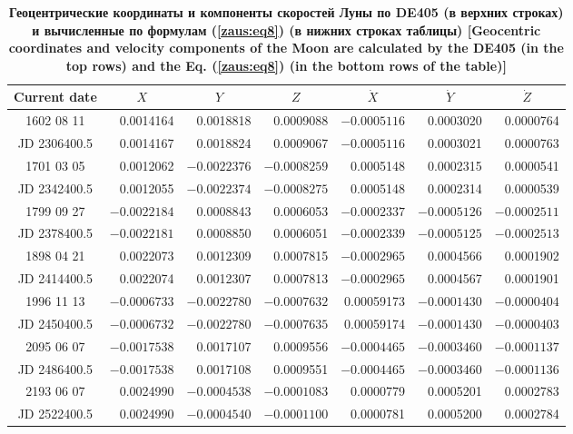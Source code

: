\begin{table}
\center \small
\begin{minipage}[t]{160mm}
\centering
\caption{\bf Геоцентрические координаты и компоненты скоростей Луны по DE405 (в верхних строках) и вычисленные по формулам  (\ref{zaus:eq8}) (в нижних строках таблицы) [Geocentric coordinates and velocity components of the Moon are calculated by the  DE405 (in the top rows) and the Eq. (\ref{zaus:eq8}) (in the bottom rows of the table)]
\vspace{-3mm}}
\begin{tabular}{|c|r|r|r|r|r|r|}
\hline
\footnotesize
\rule{0mm}{12pt}%
Current date & \multicolumn{1}{c|}{\footnotesize $X$}&	\multicolumn{1}{c|}{\footnotesize $Y$}&	\multicolumn{1}{c|}{\footnotesize $Z$}&	\multicolumn{1}{c|}{\footnotesize $\dot{X}$}&	\multicolumn{1}{c|}{\footnotesize $\dot{Y}$}&	\multicolumn{1}{c|}{\footnotesize$\dot{Z}$}\\ \hline
\rule{0mm}{14pt}%
1602 08 11&	0.0014164&	0.0018818&	0.0009088&	$-0.0005116$&	0.0003020&	  0.0000764\\
JD 2306400.5&	0.0014167&	0.0018824&	0.0009067&	$-0.0005116$&	0.0003021&	  0.0000763\\ \hline
1701 03 05&	0.0012062&	$-0.0022376$&	$-0.0008259$&	0.0005148&	0.0002315&	 0.0000541\\
JD 2342400.5&	0.0012055&	$-0.0022374$&	$-0.0008275$&	0.0005148&	0.0002314&	 0.0000539\\ \hline
1799 09 27&	$-0.0022184$&	0.0008843&	0.0006053&	$-0.0002337$ &	$-0.0005126$ &	 $-0.0002511$\\
JD 2378400.5&	$-0.0022181$ &	0.0008850&	0.0006051&	$-0.0002339$ &	$-0.0005125$&	 $-0.0002513$\\ \hline
1898 04 21&	0.0022073&	0.0012309&	0.0007815&	$-0.0002965$&	0.0004566&	 0.0001902\\
JD 2414400.5&	0.0022074&	0.0012307&	0.0007813&	$-0.0002965$&	0.0004567&	 0.0001901\\ \hline
1996 11 13&	$-0.0006733$&	$-0.0022780$&	$-0.0007632$&	0.00059173&	$-0.0001430$&	  $-0.0000404$\\
JD 2450400.5&	$-0.0006732$&	$-0.0022780$&	$-0.0007635$&	0.00059174&	$-0.0001430$&	  $-0.0000403$\\ \hline
2095 06 07&	$-0.0017538$&	0.0017107&	0.0009556&	 $-0.0004465$&	$-0.0003460$&	 $-0.0001137$\\
JD 2486400.5&	$-0.0017538$&	0.0017108&	0.0009551&	 $-0.0004465$&	$-0.0003460$&	 $-0.0001136$\\ \hline
2193 06 07&	0.0024990&	$-0.0004538$&	$-0.0001083$&	0.0000779&	0.0005201&	 0.0002783\\
JD 2522400.5&	0.0024990&	$-0.0004540$&	$-0.0001100$&	0.0000781&	0.0005200&	 0.0002784\\ \hline
\end{tabular}
\label{table:zausaev:tabl6}



\end{minipage}
\end{table}
